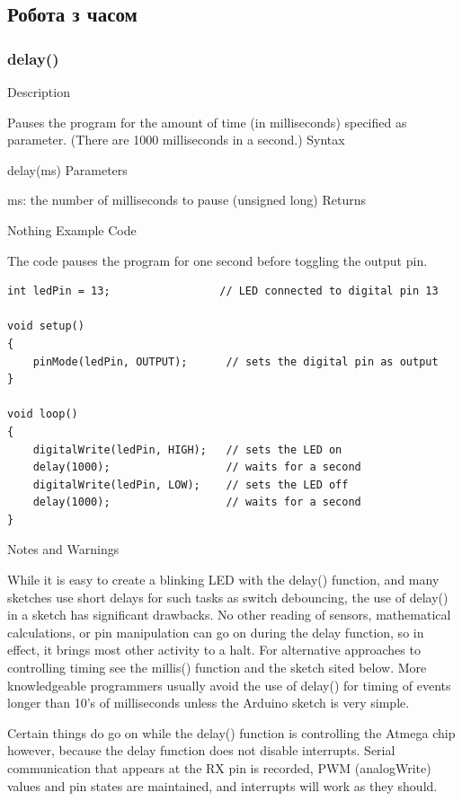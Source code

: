 \documentclass[12pt,a4paper]{report}  %
\begin{document}
\subsection{Робота з часом}

\subsubsection{delay()}\label{delay()}


Description

Pauses the program for the amount of time (in milliseconds) specified as parameter. (There are 1000 milliseconds in a second.)
Syntax

delay(ms)
Parameters

ms: the number of milliseconds to pause (unsigned long)
Returns

Nothing
Example Code

The code pauses the program for one second before toggling the output pin.

\begin{lstlisting}[label=digitalwrite,caption=delay]
int ledPin = 13;                 // LED connected to digital pin 13

void setup()
{
	pinMode(ledPin, OUTPUT);      // sets the digital pin as output
}

void loop()
{
	digitalWrite(ledPin, HIGH);   // sets the LED on
	delay(1000);                  // waits for a second
	digitalWrite(ledPin, LOW);    // sets the LED off
	delay(1000);                  // waits for a second
}
\end{lstlisting}

Notes and Warnings

While it is easy to create a blinking LED with the delay() function, and many sketches use short delays for such tasks as switch debouncing, the use of delay() in a sketch has significant drawbacks. No other reading of sensors, mathematical calculations, or pin manipulation can go on during the delay function, so in effect, it brings most other activity to a halt. For alternative approaches to controlling timing see the millis() function and the sketch sited below. More knowledgeable programmers usually avoid the use of delay() for timing of events longer than 10’s of milliseconds unless the Arduino sketch is very simple.

Certain things do go on while the delay() function is controlling the Atmega chip however, because the delay function does not disable interrupts. Serial communication that appears at the RX pin is recorded, PWM (analogWrite) values and pin states are maintained, and interrupts will work as they should.
\end{document}
